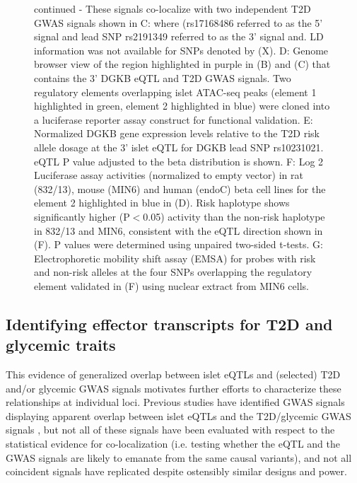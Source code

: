 \addtocounter{figure}{-1}
\begin{figure} [t!]
  \caption[Figure \ref{fig:c4_f3} continued]{continued - These signals co-localize with two independent T2D GWAS signals shown in C: where (rs17168486 referred to as the 5' signal and lead SNP rs2191349 referred to as the 3' signal and. LD information was not available for SNPs denoted by (X). D: Genome browser view of the region highlighted in purple in (B) and (C) that contains the 3' DGKB eQTL and T2D GWAS signals. Two regulatory elements overlapping islet ATAC-seq peaks (element 1 highlighted in green, element 2 highlighted in blue) were cloned into a luciferase reporter assay construct for functional validation. E: Normalized DGKB gene expression levels relative to the T2D risk allele dosage at the 3' islet eQTL for DGKB lead SNP rs10231021. eQTL P value adjusted to the beta distribution is shown. F: Log 2 Luciferase assay activities (normalized to empty vector) in rat (832/13), mouse (MIN6) and human (endoC) beta cell lines for the element 2 highlighted in blue in (D). Risk haplotype shows significantly higher (P$<$0.05) activity than the non-risk haplotype in 832/13 and MIN6, consistent with the eQTL direction shown in (F). P values were determined using unpaired two-sided t-tests. G: Electrophoretic mobility shift assay (EMSA) for probes with risk and non-risk alleles at the four SNPs overlapping the regulatory element validated in (F) using nuclear extract from MIN6 cells.} 
\end{figure}
  
\subsection{Identifying effector transcripts for T2D and glycemic traits}
This evidence of generalized overlap between islet eQTLs and (selected) T2D and/or glycemic GWAS signals motivates further efforts to characterize these relationships at individual loci. Previous studies have identified GWAS signals displaying apparent overlap between islet eQTLs and the T2D/glycemic GWAS signals \cite{varshneyGeneticRegulatorySignatures2017, fadistaGlobalGenomicTranscriptomic2014, buntTranscriptExpressionData2015}, but not all of these signals have been evaluated with respect to the statistical evidence for co-localization (i.e. testing whether the eQTL and the GWAS signals are likely to emanate from the same causal variants), and not all coincident signals have replicated despite ostensibly similar designs and power. \\

